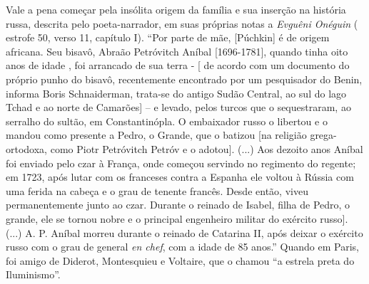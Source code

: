 Vale a pena começar pela insólita origem da família e sua inserção na
história russa, descrita pelo poeta-narrador, em suas próprias notas a
\emph{Evguêni Onéguin} ( estrofe 50, verso 11, capítulo I). ``Por parte
de mãe, {[}Púchkin{]} é de origem africana. Seu bisavô, Abraão
Petróvitch Aníbal {[}1696-1781{]}, quando tinha oito anos de idade , foi
arrancado de sua terra - {[} de acordo com um documento do próprio punho
do bisavô, recentemente encontrado por um pesquisador do Benin, informa
Boris Schnaiderman, trata-se do antigo Sudão Central, ao sul do lago
Tchad e ao norte de Camarões{]} -- e levado, pelos turcos que o
sequestraram, ao serralho do sultão, em Constantinópla. O embaixador
russo o libertou e o mandou como presente a Pedro, o Grande, que o
batizou {[}na religião grega-ortodoxa, como Piotr Petróvitch Petróv e o
adotou{]}. (...) Aos dezoito anos Aníbal foi enviado pelo czar à França,
onde começou servindo no regimento do regente; em 1723, após lutar com
os franceses contra a Espanha ele voltou à Rússia com uma ferida na
cabeça e o grau de tenente francês. Desde então, viveu permanentemente
junto ao czar. Durante o reinado de Isabel, filha de Pedro, o grande,
ele se tornou nobre e o principal engenheiro militar do exército
russo{]}. (...) A. P. Aníbal morreu durante o reinado de Catarina II,
após deixar o exército russo com o grau de general \emph{en chef}, com a
idade de 85 anos.'' Quando em Paris, foi amigo de Diderot, Montesquieu e
Voltaire, que o chamou ``a estrela preta do Iluminismo''.

